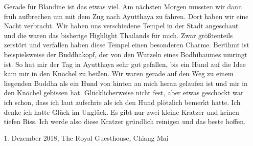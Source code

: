 \documentclass[11pt]{book}
\begin{document}
Gerade für Blandine ist das etwas viel.
Am nächsten Morgen mussten wir dann früh aufbrechen um mit dem Zug nach Ayutthaya zu fahren. Dort haben wir eine Nacht verbracht. 
Wir haben uns verschiedene Tempel in der Stadt angeschaut und die waren das bisherige Highlight Thailands für mich. Zwar größtenteils 
zerstört und verfallen haben diese Tempel einen besonderen Charme. Berühmt ist beispielsweise der Buddhakopf, der von den Wurzeln 
eines Bodhibaumes umringt ist. So hat mir der Tag in Ayutthaya sehr gut gefallen, bis ein Hund auf die Idee kam mir in den Knöchel zu 
beißen. Wir waren gerade auf den Weg zu einem liegenden Buddha als ein Hund von hinten an mich heran gelaufen ist und mir in den 
Knöchel gebissen hat. Glücklicherweise nicht fest, aber etwas geschockt war ich schon, dass ich laut aufschrie als ich den Hund 
plötzlich bemerkt hatte. Ich denke ich hatte Glück im Unglück. Es gibt nur zwei kleine Kratzer und keinen tiefen Biss. Ich werde 
also diese Kratzer gründlich reinigen und das beste hoffen. 

1. Dezember 2018, The Royal Guesthouse, Chiang Mai
\end{document}
